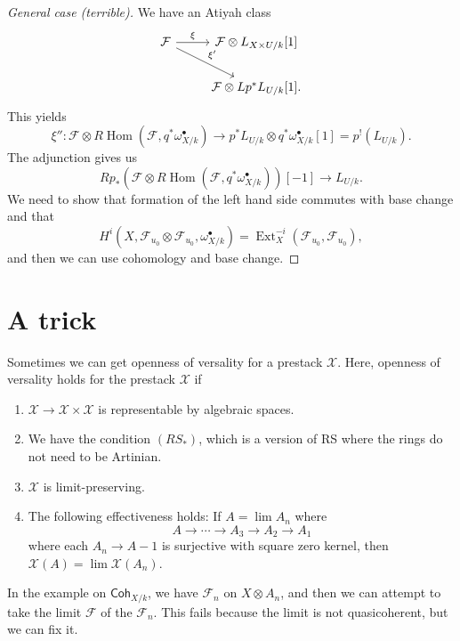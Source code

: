 \documentclass[leqno, openany]{memoir}
\theoremstyle{definition}
\theoremstyle{remark}
\theoremstyle{plain}
\theoremstyle{definition}
\theoremstyle{remark}
\newcommand{\mc}[1]{\mathcal{#1}}
\newcommand{\ms}[1]{\mathsf{#1}}
\DeclareMathOperator{\Hom}{Hom}
\DeclareMathOperator{\Ext}{Ext}
\begin{document}
\begin{proof}[General case (terrible)]
    We have an Atiyah class
    \begin{equation*}
    \begin{tikzcd}
        \mc{F} \ar{r}{\xi} \ar{dr}{\xi'} & \mc{F} \otimes L_{X \times U/k}[1] \\
        & \mc{F} \otimes Lp^* L_{U/k}[1].
    \end{tikzcd}
    \end{equation*}
    This yields
    \[ \xi'' \colon \mc{F} \otimes R\Hom(\mc{F}, q^* \omega^{\bullet}_{X/k}) \to p^* L_{U/k} \otimes q^* \omega^{\bullet}_{X/k}[1] = p^!(L_{U/k}). \]
    The adjunction gives us
    \[ R p_* (\mc{F} \otimes R \Hom(\mc{F}, q^* \omega^{\bullet}_{X/k}))[-1] \to L_{U/k}. \]
    We need to show that formation of the left hand side commutes with base change and that 
    \[ H^i(X, \mc{F}_{u_0} \otimes \mc{F}_{u_0}, \omega_{X/k}^{\bullet}) = \Ext_X^{-i}(\mc{F}_{u_0}, \mc{F}_{u_0}), \]
    and then we can use cohomology and base change.
\end{proof}

\section{A trick}%
\label{sec:a_trick}

Sometimes we can get openness of versality for a prestack $\mc{X}$. Here, openness of versality holds for the prestack $\mc{X}$ if
\begin{enumerate}
    \item $\mc{X} \to \mc{X} \times \mc{X}$ is representable by algebraic spaces.
    \item We have the condition $(RS_*)$, which is a version of RS where the rings do not need to be Artinian.
    \item $\mc{X}$ is limit-preserving.
    \item The following effectiveness holds: If $A = \lim A_n$ where
        \[ A \to \cdots \to A_3 \to A_2 \to A_1 \]
        where each $A_n \to A-1$ is surjective with square zero kernel, then $\mc{X}(A) = \lim \mc{X}(A_n)$.
\end{enumerate}

In the example on $\ms{Coh}_{X/k}$, we have $\mc{F}_n$ on $X \otimes A_n$, and then we can attempt to take the limit $\mc{F}$ of the $\mc{F}_n$. This fails because the limit is not quasicoherent, but we can fix it.
\end{document}
